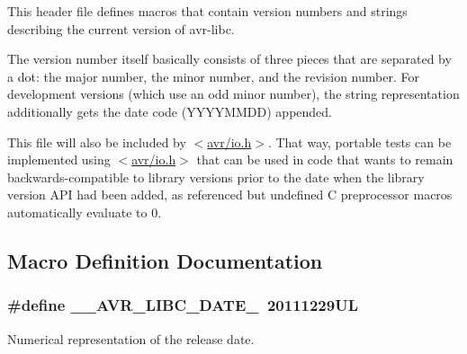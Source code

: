 This header file defines macros that contain version numbers and strings describing the current version of avr-\/libc.

The version number itself basically consists of three pieces that are separated by a dot\+: the major number, the minor number, and the revision number. For development versions (which use an odd minor number), the string representation additionally gets the date code (Y\+Y\+Y\+Y\+M\+M\+DD) appended.

This file will also be included by {\ttfamily $<$\hyperlink{io_8h}{avr/io.\+h}$>$}. That way, portable tests can be implemented using {\ttfamily $<$\hyperlink{io_8h}{avr/io.\+h}$>$} that can be used in code that wants to remain backwards-\/compatible to library versions prior to the date when the library version A\+PI had been added, as referenced but undefined C preprocessor macros automatically evaluate to 0. 

\subsection{Macro Definition Documentation}
\subsubsection[{\texorpdfstring{\+\_\+\+\_\+\+A\+V\+R\+\_\+\+L\+I\+B\+C\+\_\+\+D\+A\+T\+E\+\_\+}{__AVR_LIBC_DATE_}}]{\setlength{\rightskip}{0pt plus 5cm}\#define \+\_\+\+\_\+\+A\+V\+R\+\_\+\+L\+I\+B\+C\+\_\+\+D\+A\+T\+E\+\_\+~20111229\+UL}\hypertarget{group__avr__version_ga09c3581176726e46963330ae12270bf6}{}\label{group__avr__version_ga09c3581176726e46963330ae12270bf6}
Numerical representation of the release date. 
